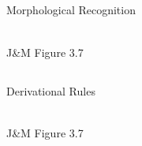 \documentclass[9pt,xcolor=pdftex,dvipsnames,table]{beamer}
\begin{document}
\subsection{}
\begin{frame}{Morphological Recognition}
\begin{center}
	\\
	{\large J\&M Figure 3.7}\\
\end{center}
\end{frame}

\subsection{}
\begin{frame}{Derivational Rules}
\begin{center}
	\\
	{\large J\&M Figure 3.7}\\
\end{center}
\end{frame}
\end{document}
